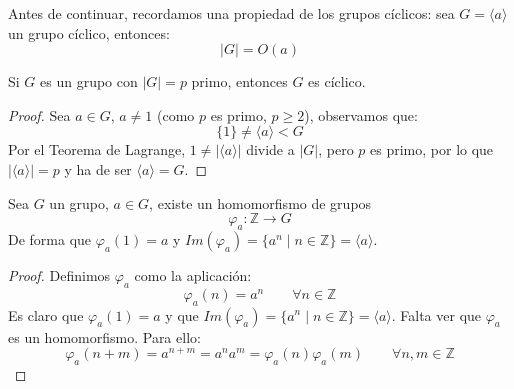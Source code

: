 Antes de continuar, recordamos una propiedad de los grupos cíclicos: sea $G = \langle a \rangle $ un grupo cíclico, entonces:
\begin{equation*}
    |G| = O(a)
\end{equation*}

\begin{prop}
    Si $G$ es un grupo con $|G|=p$ primo, entonces $G$ es cíclico.
    \begin{proof}
        Sea $a\in G$, $a\neq 1$ (como $p$ es primo, $p\geq 2$), observamos que:
        \begin{equation*}
            \{1\} \neq \langle a \rangle < G
        \end{equation*}
        Por el Teorema de Lagrange, $1\neq |\langle a \rangle | $ divide a $|G|$, pero $p$ es primo, por lo que $|\langle a \rangle | = p$ y ha de ser $\langle a \rangle = G$.
    \end{proof}
\end{prop}

\begin{lema}
    Sea $G$ un grupo, $a\in G$, existe un homomorfismo de grupos 
    \begin{equation*}
        \varphi_a:\mathbb{Z}\to G
    \end{equation*}
    De forma que $\varphi_a(1) = a$ y $Im(\varphi_a) = \{a^n \mid n \in \mathbb{Z}\} = \langle a \rangle$.
    \begin{proof}
        Definimos $\varphi_a$ como la aplicación:
        \begin{equation*}
            \varphi_a(n) = a^n \qquad \forall n\in \mathbb{Z}
        \end{equation*}
        Es claro que $\varphi_a(1)=a$ y que $Im(\varphi_a) = \{a^n \mid n\in \mathbb{Z}\} = \langle a \rangle $. Falta ver que $\varphi_a$ es un homomorfismo. Para ello:
        \begin{equation*}
            \varphi_a(n+m) = a^{n+m} = a^n a^m = \varphi_a(n)\varphi_a(m) \qquad \forall n,m\in \mathbb{Z}
        \end{equation*}
    \end{proof}
\end{lema}


